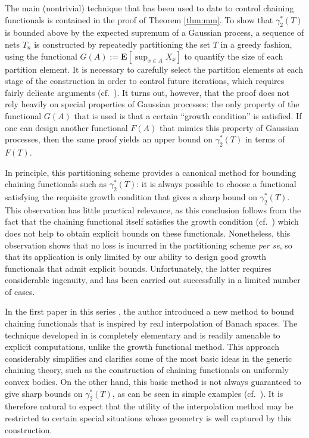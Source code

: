 \documentclass[10pt,reqno]{amsart}
\theoremstyle{definition}
\numberwithin{equation}{section}
\numberwithin{figure}{section}
\numberwithin{table}{section}
\begin{document}
The main (nontrivial) technique that has been used to date to control 
chaining functionals is contained in the proof of Theorem \ref{thm:mm}. To 
show that $\gamma_2^*(T)$ is bounded above by the expected supremum of a 
Gaussian process, a sequence of nets $T_n$ is constructed by repeatedly 
partitioning the set $T$ in a greedy fashion, using the functional 
$G(A):=\mathbf{E}[\sup_{x\in A}X_x]$ to quantify the size of each 
partition element. It is necessary to carefully select the partition 
elements at each stage of the construction in order to control future 
iterations, which requires fairly delicate arguments (cf.\ \cite[section 
2.6]{Tal14}). It turns out, however, that the proof does not rely heavily 
on special properties of Gaussian processes: the only property of the 
functional $G(A)$ that is used is that a certain ``growth condition'' is 
satisfied. If one can design another functional $F(A)$ that mimics this 
property of Gaussian processes, then the same proof yields an upper bound 
on $\gamma_2^*(T)$ in terms of $F(T)$.

In principle, this partitioning scheme provides a canonical method for 
bounding chaining functionals such as $\gamma_2^*(T)$: it is always 
possible to choose a functional satisfying the requisite growth condition 
that gives a sharp bound on $\gamma_2^*(T)$. This observation has little 
practical relevance, as this conclusion follows from the fact that the 
chaining functional itself satisfies the growth condition (cf.\ \cite[pp.\ 
38--40]{Tal14}) which does not help to obtain explicit bounds on these 
functionals. Nonetheless, this observation shows that no loss is incurred 
in the partitioning scheme \emph{per se}, so that its application is only 
limited by our ability to design good growth functionals that admit 
explicit bounds. Unfortunately, the latter requires considerable 
ingenuity, and has been carried out successfully in a limited number of 
cases.

In the first paper in this series \cite{vH16a}, the author introduced a 
new method to bound chaining functionals that is inspired by real 
interpolation of Banach spaces. The technique developed in \cite{vH16a} is 
completely elementary and is readily amenable to explicit computations, 
unlike the growth functional method. This approach considerably simplifies 
and clarifies some of the most basic ideas in the generic chaining theory, 
such as the construction of chaining functionals on uniformly convex 
bodies. On the other hand, this basic method is not always guaranteed to 
give sharp bounds on $\gamma_2^*(T)$, as can be seen in simple examples 
(cf.\ \cite[section 3.3]{vH16a}). It is therefore natural to expect that 
the utility of the interpolation method may be restricted to certain 
special situations whose geometry is well captured by this construction.
\end{document}
